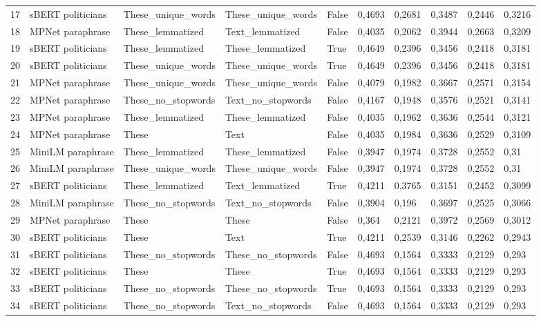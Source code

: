 \begin{tabular}{llllllllll}
17 & sBERT politicians & These_unique_words & These_unique_words & False & 0,4693 & 0,2681 & 0,3487 & 0,2446 & 0,3216 \\
18 & MPNet paraphrase & These_lemmatized & Text_lemmatized & False & 0,4035 & 0,2062 & 0,3944 & 0,2663 & 0,3209 \\
19 & sBERT politicians & These_lemmatized & These_lemmatized & True & 0,4649 & 0,2396 & 0,3456 & 0,2418 & 0,3181 \\
20 & sBERT politicians & These_unique_words & These_unique_words & True & 0,4649 & 0,2396 & 0,3456 & 0,2418 & 0,3181 \\
21 & MPNet paraphrase & These_unique_words & These_unique_words & False & 0,4079 & 0,1982 & 0,3667 & 0,2571 & 0,3154 \\
22 & MPNet paraphrase & These_no_stopwords & Text_no_stopwords & False & 0,4167 & 0,1948 & 0,3576 & 0,2521 & 0,3141 \\
23 & MPNet paraphrase & These_lemmatized & These_lemmatized & False & 0,4035 & 0,1962 & 0,3636 & 0,2544 & 0,3121 \\
24 & MPNet paraphrase & These & Text & False & 0,4035 & 0,1984 & 0,3636 & 0,2529 & 0,3109 \\
25 & MiniLM paraphrase & These_lemmatized & These_lemmatized & False & 0,3947 & 0,1974 & 0,3728 & 0,2552 & 0,31 \\
26 & MiniLM paraphrase & These_unique_words & These_unique_words & False & 0,3947 & 0,1974 & 0,3728 & 0,2552 & 0,31 \\
27 & sBERT politicians & These_lemmatized & Text_lemmatized & True & 0,4211 & 0,3765 & 0,3151 & 0,2452 & 0,3099 \\
28 & MiniLM paraphrase & These_no_stopwords & Text_no_stopwords & False & 0,3904 & 0,196 & 0,3697 & 0,2525 & 0,3066 \\
29 & MPNet paraphrase & These & These & False & 0,364 & 0,2121 & 0,3972 & 0,2569 & 0,3012 \\
30 & sBERT politicians & These & Text & True & 0,4211 & 0,2539 & 0,3146 & 0,2262 & 0,2943 \\
31 & sBERT politicians & These_no_stopwords & These_no_stopwords & False & 0,4693 & 0,1564 & 0,3333 & 0,2129 & 0,293 \\
32 & sBERT politicians & These & These & True & 0,4693 & 0,1564 & 0,3333 & 0,2129 & 0,293 \\
33 & sBERT politicians & These_no_stopwords & These_no_stopwords & True & 0,4693 & 0,1564 & 0,3333 & 0,2129 & 0,293 \\
34 & sBERT politicians & These_no_stopwords & Text_no_stopwords & False & 0,4693 & 0,1564 & 0,3333 & 0,2129 & 0,293 \\

\end{tabular}
